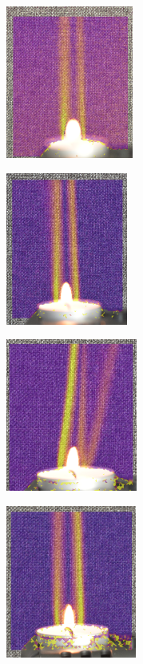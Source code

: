 \documentclass[letterpaper,12pt]{article}
\begin{document}
\begin{figure}[h]
    \centering
    \begin{subfigure}[b]{0.35\textwidth}
    	\centering
        \includegraphics[height=5cm]{FNumber_1p8_0_2.PNG}
        \caption{}
        \label{fig:FNumber_1p8_0_2}
    \end{subfigure}
    \begin{subfigure}[b]{0.35\textwidth}
    	\centering
        \includegraphics[height=5cm]{FNumber_5_0_2.PNG}
        \caption{}
        \label{fig:FNumber_5_0_2}
    \end{subfigure}
    
    \begin{subfigure}[b]{0.35\textwidth}
    	\centering
        \includegraphics[height=5cm]{FNumber_10_0_2.PNG}
        \caption{}
        \label{fig:FNumber_10_0_2}
    \end{subfigure}
    \begin{subfigure}[b]{0.35\textwidth}
    	\centering
        \includegraphics[height=5cm]{FNumber_20_0_2.PNG}
        \caption{}
        \label{fig:FNumber_20_0_2}
    \end{subfigure}


\end{figure}
\end{document}
